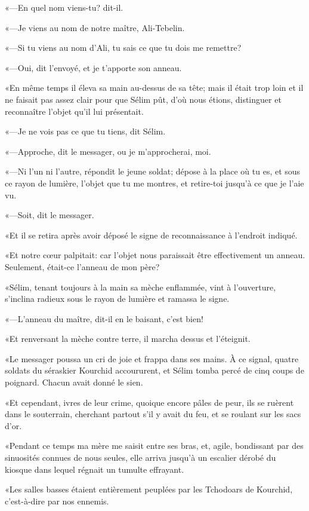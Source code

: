 «—En quel nom viens-tu? dit-il. 

«—Je viens au nom de notre maître, Ali-Tebelin. 

«—Si tu viens au nom d'Ali, tu sais ce que tu dois me remettre? 

«—Oui, dit l'envoyé, et je t'apporte son anneau. 

«En même temps il éleva sa main au-dessus de sa tête; mais il était trop loin et il ne faisait pas assez clair pour que Sélim pût, d'où nous étions, distinguer et reconnaître l'objet qu'il lui présentait. 

«—Je ne vois pas ce que tu tiens, dit Sélim. 

«—Approche, dit le messager, ou je m'approcherai, moi. 

«—Ni l'un ni l'autre, répondit le jeune soldat; dépose à la place où tu es, et sous ce rayon de lumière, l'objet que tu me montres, et retire-toi jusqu'à ce que je l'aie vu. 

«—Soit, dit le messager. 

«Et il se retira après avoir déposé le signe de reconnaissance à l'endroit indiqué. 

«Et notre cœur palpitait: car l'objet nous paraissait être effectivement un anneau. Seulement, était-ce l'anneau de mon père? 

«Sélim, tenant toujours à la main sa mèche enflammée, vint à l'ouverture, s'inclina radieux sous le rayon de lumière et ramassa le signe. 

«—L'anneau du maître, dit-il en le baisant, c'est bien!  

«Et renversant la mèche contre terre, il marcha dessus et l'éteignit. 

«Le messager poussa un cri de joie et frappa dans ses mains. À ce signal, quatre soldats du séraskier Kourchid accoururent, et Sélim tomba percé de cinq coups de poignard. Chacun avait donné le sien. 

«Et cependant, ivres de leur crime, quoique encore pâles de peur, ils se ruèrent dans le souterrain, cherchant partout s'il y avait du feu, et se roulant sur les sacs d'or. 

«Pendant ce temps ma mère me saisit entre ses bras, et, agile, bondissant par des sinuosités connues de nous seules, elle arriva jusqu'à un escalier dérobé du kiosque dans lequel régnait un tumulte effrayant. 

«Les salles basses étaient entièrement peuplées par les Tchodoars de Kourchid, c'est-à-dire par nos ennemis. 

